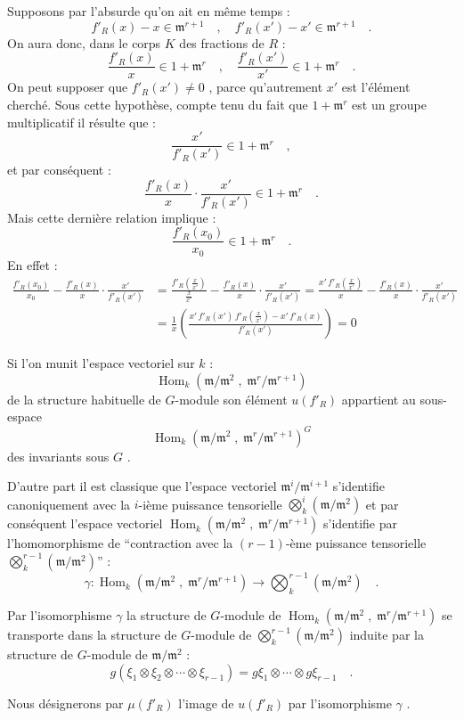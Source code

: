 \documentclass[11pt]{article}
\providecommand{\fm}{\mathfrak{m}}
\DeclareMathOperator{\Hom}{Hom}
\providecommand{\Hom}{\operatorname{Hom}}
\providecommand{\fm}{\mathfrak m}
\providecommand{\Hom}{\operatorname{Hom}}
\begin{document}
Supposons par l'absurde qu'on ait en même temps :
\[
f'_R(x) - x \in \fm^{r+1} \quad , \quad f'_R(x') - x' \in \fm^{r+1} \quad .
\]
On aura donc, dans le corps $K$ des fractions de $R$ :
\[
\frac{f'_R(x)}{x} \in 1 + \fm^r \quad , \quad \frac{f'_R(x')}{x'} \in 1 + \fm^r \quad .
\]
On peut supposer que $f'_R(x') \neq 0$ , parce qu'autrement $x'$ est l'élément cherché. Sous cette hypothèse, compte tenu du fait que $1 + \fm^r$ est un groupe multiplicatif il résulte que :
\[
\frac{x'}{f'_R(x')} \in 1 + \fm^r \quad ,
\]
et par conséquent :
\[
\frac{f'_R(x)}{x} \cdot \frac{x'}{f'_R(x')} \in 1 + \fm^r \quad .
\]
Mais cette dernière relation implique :
\[
\frac{f'_R(x_0)}{x_0} \in 1 + \fm^r \quad .
\]
En effet :
\[
\begin{aligned}
\frac{f'_R(x_0)}{x_0} - \frac{f'_R(x)}{x} \cdot \frac{x'}{f'_R(x')}
&= \frac{f'_R(\frac{x}{x'})}{\frac{x}{x'}} - \frac{f'_R(x)}{x} \cdot \frac{x'}{f'_R(x')}
= \frac{x'\,f'_R(\frac{x}{x'})}{x} - \frac{f'_R(x)}{x} \cdot \frac{x'}{f'_R(x')} \\
&= \frac{1}{x}\left(\frac{x'\,f'_R(x')\,f'_R(\frac{x}{x'}) - x'\,f'_R(x)}{f'_R(x')}\right) = 0
\end{aligned}
\]

Si l'on
munit l'espace vectoriel sur $k$ :
\[
\Hom_k(\fm/\fm^2 \; , \; \fm^r/\fm^{r+1})
\]
de la structure habituelle de $G$-module son élément $u(f'_R)$ appartient au sous-espace
\[
\Hom_k(\fm/\fm^2 \; , \; \fm^r/\fm^{r+1})^G
\]
des invariants sous $G$ .

D'autre part il est classique que l'espace vectoriel $\fm^i/\fm^{i+1}$ s'identifie canoniquement avec la $i$-ième puissance tensorielle $\bigotimes_k^i (\fm/\fm^2)$ et par conséquent l'espace vectoriel $\Hom_k(\fm/\fm^2 \; , \; \fm^r/\fm^{r+1})$ s'identifie par l'homomorphisme de ``contraction avec la $(r-1)$-ème puissance tensorielle $\bigotimes_k^{r-1}(\fm/\fm^2)$'' :
\[
\gamma : \Hom_k(\fm/\fm^2 \; , \; \fm^r/\fm^{r+1}) \longrightarrow \bigotimes_k^{r-1}(\fm/\fm^2) \quad .
\]

Par l'isomorphisme $\gamma$ la structure de $G$-module de $\Hom_k(\fm/\fm^2 \; , \; \fm^r/\fm^{r+1})$ se transporte dans la structure de $G$-module de $\bigotimes_k^{r-1}(\fm/\fm^2)$ induite par la structure de $G$-module de $\fm/\fm^2$ :
\[
g(\xi_1 \otimes \xi_2 \otimes \cdots \otimes \xi_{r-1}) = g\xi_1 \otimes \cdots \otimes g\xi_{r-1} \quad .
\]

Nous désignerons par $\mu(f'_R)$ l'image de $u(f'_R)$ par l'isomorphisme $\gamma$ .
\end{document}
